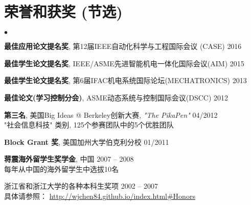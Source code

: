 \documentclass[UTF8,nofonts]{res}
\begin{document}
\begin{resume}
\begin{list}{}{\setlength\leftmargin{0in}\setlength\topsep{0.15in}}
\end{list}

\section{荣誉和获奖 (节选)}
\vspace{0.2in}

\begin{list}{$\bullet$}{\setlength\leftmargin{0in}\setlength\topsep{0in}}
\item \textbf{最佳应用论文提名奖}, {第12届IEEE自动化科学与工程国际会议 (CASE)} \hfill{2016}
\item \textbf{最佳学生论文提名奖}, {IEEE/ASME先进智能机电一体化国际会议(AIM)} \hfill{2015}
\item \textbf{最佳学生论文提名奖}, {第6届IFAC机电系统国际论坛(MECHATRONICS)} \hfill{2013}
\item \textbf{最佳论文(学习控制分会)}, {ASME动态系统与控制国际会议(DSCC)} \hfill{2012}
\item \textbf{第三名}, 美国Big Ideas @ Berkeley创新大赛, \emph{"The PikaPen"} \hfill{04/2012} \\
"社会信息科技" 类别, 125个参赛团队中的5个优胜团队
\item \textbf{Block Grant 奖}, 美国加州大学伯克利分校 \hfill{01/2011}
\item \textbf{蒋震海外留学生奖学金}, 中国 \hfill{2007 -- 2008}\\
每年从中国的海外留学生中选拔10名
\item 浙江省和浙江大学的各种本科生奖项 \hfill{2002 -- 2007}\\
具体请参照： \url{http://wjchen84.github.io/index.html#Honors}

\end{list}
\end{resume}
\end{document}
